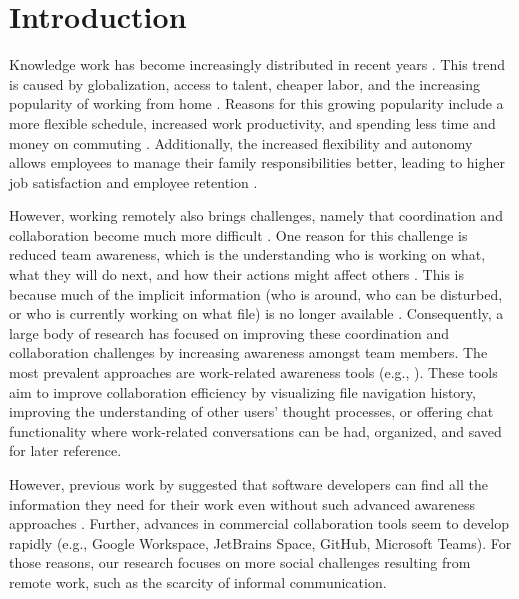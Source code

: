 \chapter{Introduction}
\label{chapter:introduction}
Knowledge work has become increasingly distributed in recent years \autocite{herbsleb2001global}. This trend is caused by globalization, access to talent, cheaper labor,  and the increasing popularity of working from home \autocite{herbsleb2007global, ecoWorkingFromHome2021}. Reasons for this growing popularity include a more flexible schedule, increased work productivity, and spending less time and money on commuting \autocite{flores2019understanding, mulki2009set}. Additionally, the increased flexibility and autonomy allows employees to manage their family responsibilities better, leading to higher job satisfaction and employee retention \autocite{mulki2009set, gajendran2007good, madsen2011benefits}.

However, working remotely also brings challenges, namely that coordination and collaboration become much more difficult \autocite{herbsleb2007global}. One reason for this challenge is reduced team awareness, which is the understanding who is working on what, what they will do next, and how their actions might affect others \autocite{dourish1992awareness, herbsleb2007global, gutwin2004group}. %
This is because much of the implicit information (who is around, who can be disturbed, or who is currently working on what file) is no longer available \autocite{gutwin2004importance}. Consequently, a large body of research has focused on improving these coordination and collaboration challenges by increasing awareness amongst team members. The most prevalent approaches are work-related awareness tools (e.g., \autocite{biehl2007fastdash, jakobsen2009wipdash, cheng2003jazzing, deline2005easing}). These tools aim to improve collaboration efficiency by visualizing file navigation history, improving the understanding of other users' thought processes, or offering chat functionality where work-related conversations can be had, organized, and saved for later reference. 

However, previous work by \citeauthor{gutwin2004group} suggested that software developers can find all the information they need for their work even without such advanced awareness approaches \autocite{gutwin2004group}. Further, advances in commercial collaboration tools seem to develop rapidly (e.g., Google Workspace, JetBrains Space, GitHub, Microsoft Teams). For those reasons, our research focuses on more social challenges resulting from remote work, such as the scarcity of informal communication.

